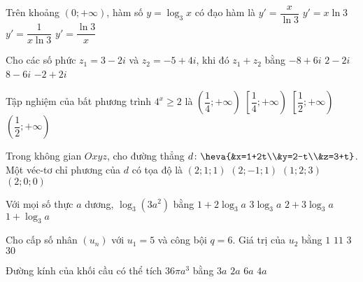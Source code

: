 \begin{ex}%
	Trên khoảng $(0;+\infty)$, hàm số $y=\log_3x$ có đạo hàm là
	\choice
	{$y'=\dfrac{x}{\ln3}$}
	{$y'=x\ln3$}
	{\True$y'=\dfrac{1}{x\ln3}$}
	{$y'=\dfrac{\ln3}{x}$}
\end{ex}

\begin{ex}%
	Cho các số phức $z_1=3-2i$ và $z_2=-5+4i$, khi đó $z_1+z_2$ bằng
	\choice
	{$-8+6i$}
	{$2-2i$}
	{$8-6i$}
	{\True$-2+2i$}
\end{ex}

\begin{ex}%
	Tập nghiệm của bất phương trình $4^x \ge 2$ là
	\choice
	{$\left(\dfrac{1}{4};+\infty\right)$}
	{$\left[\dfrac{1}{4};+\infty\right)$}
	{\True$\left[\dfrac{1}{2};+\infty\right)$}
	{$\left(\dfrac{1}{2};+\infty\right)$}
	\loigiai{
		$4^x \ge 2 \Leftrightarrow 2^{2x} \ge 2 \Leftrightarrow 2x \ge 1 \Leftrightarrow x \ge \dfrac{1}{2}$.\\
		Vậy tập nghiệm của bất phương trình là $S=\left[\dfrac{1}{2};+\infty\right)$.
	}
\end{ex}

\begin{ex}%
	Trong không gian $Oxyz$, cho đường thẳng $d \colon \heva{&x=1+2t\\&y=2-t\\&z=3+t}$. Một véc-tơ chỉ phương của $d$ có tọa độ là
	\choice
	{$(2;1;1)$}
	{\True$(2;-1;1)$}
	{$(1;2;3)$}
	{$(2;0;0)$}
\end{ex}

\begin{ex}%
	Với mọi số thực $a$ dương, $\log_3(3a^2)$ bằng
	\choice
	{\True$1+2\log_3a$}
	{$3\log_3a$}
	{$2+3\log_3a$}
	{$1+\log_3a$}
\end{ex}

\begin{ex}%
	Cho cấp số nhân $(u_n)$ với $u_1=5$ và công bội $q=6$. Giá trị của $u_2$ bằng
	\choice
	{$1$}
	{$11$}
	{$3$}
	{\True$30$}
\end{ex}

\begin{ex}%
	Đường kính của khối cầu có thể tích $36\pi a^3$ bằng
	\choice
	{$3a$}
	{$2a$}
	{\True $6a$}
	{$4a$}
\end{ex}

